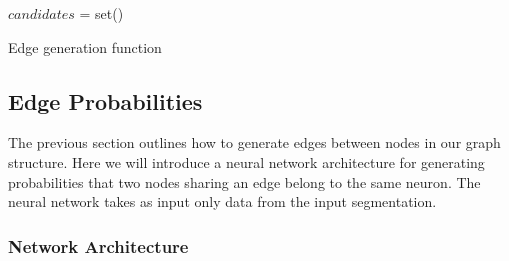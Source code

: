 \begin{algorithm}
	\begin{algorithmic}
				\State $candidates$ = set()
					
				\EndFor
			\EndFor
		\EndFunction
	\end{algorithmic}
	\caption{Edge generation function}
	\label{alg:generate-edges}
\end{algorithm}
\subsection{Edge Probabilities}

The previous section outlines how to generate edges between nodes in our graph structure. Here we will introduce a neural network architecture for generating probabilities that two nodes sharing an edge belong to the same neuron. The neural network takes as input only data from the input segmentation. 

\subsubsection{Network Architecture}

